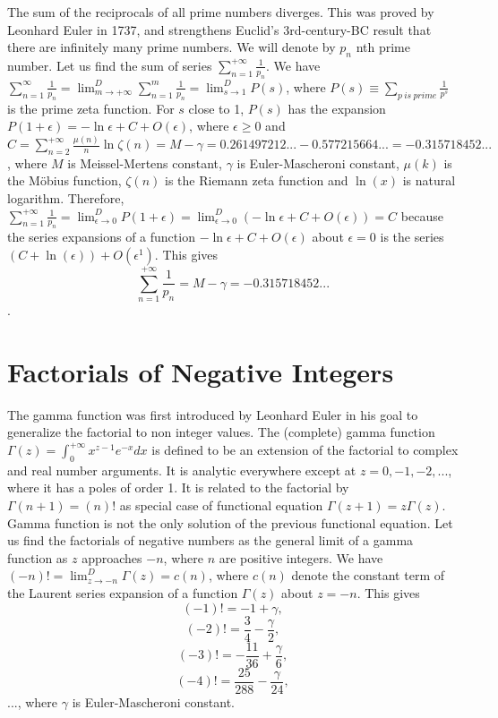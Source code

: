 \documentclass[12pt]{article}
\begin{document}
The sum of the reciprocals of all prime numbers diverges. This was proved by Leonhard Euler in 1737, and strengthens Euclid's 3rd-century-BC result that there are infinitely many prime numbers.
We will denote by $p_n$ nth prime number.
Let us find the sum of series $\sum_{n=1}^{+\infty}\frac{1}{p_n}$. We have $\sum_{n=1}^{\infty}\frac{1}{p_n}=\lim^D_{m\to+\infty}\sum_{n=1}^m \frac{1}{p_n}=\lim^D_{s\to 1}P(s)$, where $P(s)\equiv\displaystyle\sum_{p\ is\ prime}\frac{1}{p^s}$ is the prime zeta function. For $s$ close to 1, $P(s)$ has the expansion $P(1+\epsilon)=-\ln\epsilon+C+O(\epsilon)$, where $\epsilon\geq 0$ and $C=\sum_{n=2}^{+\infty} \frac{\mu(n)}{n}\ln\zeta(n)=M-\gamma=0.261497212...-0.577215664...=-0.315718452...$, where $M$ is Meissel-Mertens constant, $\gamma$ is Euler-Mascheroni constant, $\mu(k)$ is the M\"{o}bius function, $\zeta(n)$ is the Riemann zeta function and $\ln(x)$ is natural logarithm.
Therefore, $\sum_{n=1}^{+\infty}\frac{1}{p_n}=\lim^D_{\epsilon\to 0}P(1+\epsilon)=\lim^D_{\epsilon\to 0}(-\ln\epsilon+C+O(\epsilon))=C$ because the series expansions of a function $-\ln\epsilon+C+O(\epsilon)$ about $\epsilon=0$ is the series $(C+\ln (\epsilon))+O\left(\epsilon^1\right)$.
This gives $$\sum_{n=1}^{+\infty}\frac{1}{p_n}=M-\gamma=-0.315718452...$$.

\section{Factorials of Negative Integers}
\label{section:fact} 

The gamma function was first introduced by Leonhard Euler in his goal to generalize the factorial to non integer values. The (complete) gamma function $\Gamma(z)=\int_0^{+\infty}x^{z-1}e^{-x}dx$ is defined to be an extension of the factorial to complex and real number arguments. It is analytic everywhere except at $z=0, -1, -2, ...$, where it has a poles of order 1. It is related to the factorial by $\Gamma(n+1)=(n)!$ as special case of functional equation $\Gamma(z+1)=z\Gamma(z)$. Gamma function is not the only solution of the previous functional equation.
Let us find the factorials of negative numbers as the general limit of a gamma function as $z$ approaches $-n$, where $n$ are positive integers. We have $(-n)!=\lim^D_{z\to -n}\Gamma(z)=c(n)$, where $c(n)$ denote the constant term of the Laurent series expansion of a function $\Gamma(z)$ about $z=-n$.
This gives $$(-1)!=-1+\gamma,$$ $$(-2)!=\frac{3}{4}-\frac{\gamma}{2},$$ $$(-3)!=-\frac{11}{36}+\frac{\gamma}{6},$$ $$(-4)!=\frac{25}{288}-\frac{\gamma}{24},$$..., where $\gamma$ is Euler-Mascheroni constant.
\end{document}
